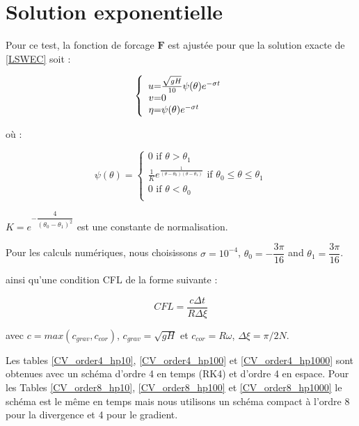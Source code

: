 \section{Solution exponentielle}

Pour ce test, la fonction de forcage $\mathbf{F}$ est ajustée pour que la solution exacte de \eqref{LSWEC} soit :

\begin{equation}
\left\lbrace
\begin{array}{r @{=} l}
u & \frac{\sqrt{gH}}{10} \psi ( \theta )  e^{-\sigma t} \\
v & 0 \\
\eta & \psi( \theta ) e^{-\sigma t}
\end{array}
\right.
\end{equation}

où :

\begin{equation*}
\psi ( \theta ) = 
\left\lbrace
\begin{array}{l}
0 \text{ if } \theta > \theta_1\\
\frac{1}{K}e^{\frac{1}{(\theta - \theta_0)(\theta-\theta_1)}} \text{ if } \theta_0 \leq \theta \leq \theta_1 \\
0 \text{ if } \theta < \theta_0\\
 
\end{array}
\right.
\label{galewski_fun}
\end{equation*}

$K = e^{-\dfrac{4}{(\theta_0 - \theta_1)^2}}$ est une constante de normalisation.

Pour les calculs numériques, nous choisissons $\sigma = 10^{-4}$, $\theta_0 = -\dfrac{3 \pi}{16}$ and $\theta_1 = \dfrac{3 \pi}{16}$.

ainsi qu'une condition CFL de la forme suivante :

\begin{equation}
CFL = \dfrac{c \Delta t}{R \Delta \xi}
\end{equation}

avec $c = max(c_{grav}, c_{cor})$, $c_{grav} = \sqrt{gH}$ et $c_{cor} = R \omega$, $\Delta \xi = \pi / 2N$.

Les tables \ref{CV_order4_hp10}, \ref{CV_order4_hp100} et \ref{CV_order4_hp1000} sont obtenues avec un schéma d'ordre 4 en temps (RK4) et d'ordre 4 en espace. Pour les Tables \ref{CV_order8_hp10}, \ref{CV_order8_hp100} et \ref{CV_order8_hp1000} le schéma est le même en temps mais nous utilisons un schéma compact à l'ordre 8 pour la divergence et 4 pour le gradient.

